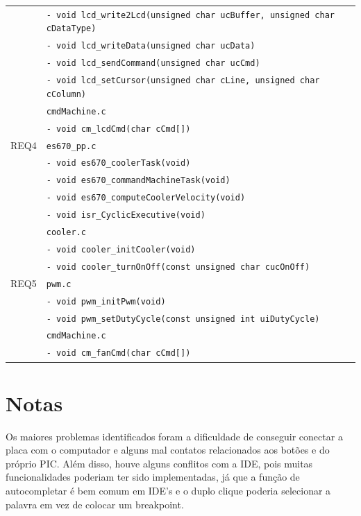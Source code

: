 \documentclass{article}
\begin{document}
\begin{table}[H]
\begin{tabular}{|c|l|}
						& \texttt{- void lcd\_write2Lcd(unsigned char ucBuffer,  unsigned char cDataType)}\\
						& \texttt{- void lcd\_writeData(unsigned char ucData)}\\
						& \texttt{- void lcd\_sendCommand(unsigned char ucCmd)}\\
						& \texttt{- void lcd\_setCursor(unsigned char cLine, unsigned char cColumn)}\\
						& \texttt{cmdMachine.c}\\ 
						& \texttt{- void cm\_lcdCmd(char cCmd[])}\\
        \hline REQ4     & \texttt{es670\_pp.c}\\
                        & \texttt{- void es670\_coolerTask(void)}\\
                        & \texttt{- void es670\_commandMachineTask(void)}\\
                        & \texttt{- void es670\_computeCoolerVelocity(void)}\\
                        & \texttt{- void isr\_CyclicExecutive(void)}\\
                        & \texttt{cooler.c}\\
                        & \texttt{- void cooler\_initCooler(void)}\\
                        & \texttt{- void cooler\_turnOnOff(const unsigned char cucOnOff)}\\
        \hline REQ5     & \texttt{pwm.c}\\
                        & \texttt{- void pwm\_initPwm(void)}\\
                        & \texttt{- void pwm\_setDutyCycle(const unsigned int uiDutyCycle)}\\
                        & \texttt{cmdMachine.c}\\
                        & \texttt{- void cm\_fanCmd(char cCmd[])}\\
		\hline 
	\end{tabular} 
	\normalsize
\end{table}
\section{Notas}
Os maiores problemas identificados foram a dificuldade de conseguir conectar a placa com o computador e alguns mal contatos relacionados aos botões e do próprio PIC. Além disso, houve alguns conflitos com a IDE, pois muitas funcionalidades poderiam ter sido implementadas, já que a função de autocompletar é bem comum em IDE's e o duplo clique poderia selecionar a palavra em vez de colocar um breakpoint.
\end{document}
